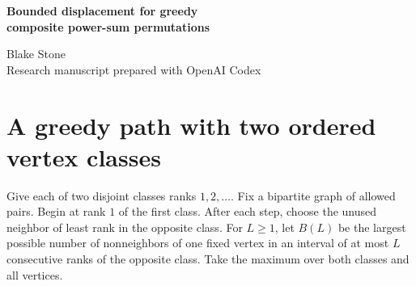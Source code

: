 \documentclass[11pt,letterpaper]{article}
\newcommand{\oeis}[1]{\href{https://oeis.org/A#1}{A#1}}
\begin{document}
\thispagestyle{plain}
\begin{center}
{\LARGE\bfseries Bounded displacement for greedy\\[0.12em] composite power-sum permutations\par}
\vspace{0.5em}
Blake Stone\\
{\small Research manuscript prepared with OpenAI Codex}
\end{center}

\begin{abstract}
Starting from $1$, take at each step the least unused positive integer of opposite parity whose $d$th power added to the previous $d$th power is composite. For every fixed positive integer $d$ this gives a permutation of bounded displacement. Every positive integer $m$ occurs in OEIS \oeis{203069} by position $m+2000$, answering a question recorded by N.~J.~A.~Sloane. For the square-sum rule \oeis{203077}, the first displacement exceeding six in absolute value occurs at position $11917$ and equals eight.
\end{abstract}

\section{A greedy path with two ordered vertex classes}
Give each of two disjoint classes ranks $1,2,\ldots$. Fix a bipartite graph of allowed pairs. Begin at rank $1$ of the first class. After each step, choose the unused neighbor of least rank in the opposite class. For $L\ge1$, let $B(L)$ be the largest possible number of nonneighbors of one fixed vertex in an interval of at most $L$ consecutive ranks of the opposite class. Take the maximum over both classes and all vertices.
\end{document}
